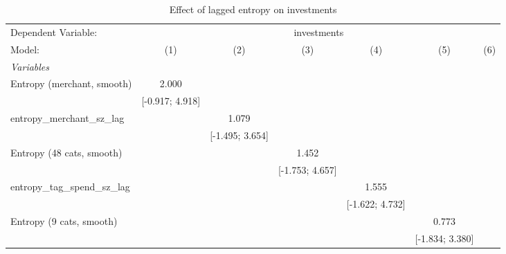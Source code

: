 
\begin{table}[htbp]
   \centering
   \tiny
   \begin{threeparttable}[b]
      \caption{\label{tab:reg_investments_lagged_sz} Effect of lagged entropy on investments}
      \begin{tabular}{lcccccc}
         \tabularnewline \midrule \midrule
         Dependent Variable: & \multicolumn{6}{c}{investments}\\
         Model:                           & (1)              & (2)              & (3)              & (4)              & (5)              & (6)\\  
         \midrule
         \emph{Variables}\\
         Entropy (merchant, smooth)       & 2.000            &                  &                  &                  &                  &   \\   
                                          & [-0.917; 4.918]  &                  &                  &                  &                  &   \\   
         entropy\_merchant\_sz\_lag       &                  & 1.079            &                  &                  &                  &   \\   
                                          &                  & [-1.495; 3.654]  &                  &                  &                  &   \\   
         Entropy (48 cats, smooth)        &                  &                  & 1.452            &                  &                  &   \\   
                                          &                  &                  & [-1.753; 4.657]  &                  &                  &   \\   
         entropy\_tag\_spend\_sz\_lag     &                  &                  &                  & 1.555            &                  &   \\   
                                          &                  &                  &                  & [-1.622; 4.732]  &                  &   \\   
         Entropy (9 cats, smooth)         &                  &                  &                  &                  & 0.773            &   \\   
                                          &                  &                  &                  &                  & [-1.834; 3.380]  &   \\   

\end{tabular}
\end{threeparttable}
\end{table}
